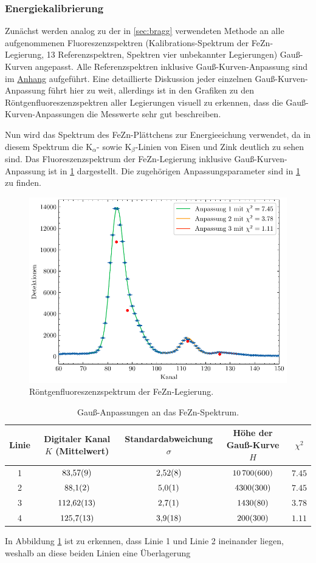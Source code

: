 \subsubsection*{Energiekalibrierung}\label{subsubsec:energie_kali}
Zunächst werden analog zu der in \cref{sec:bragg} verwendeten Methode an alle aufgenommenen Fluoreszenzspektren (Kalibrations-Spektrum der FeZn-Legierung, 13 Referenzspektren, Spektren vier unbekannter Legierungen)
Gauß-Kurven angepasst. Alle Referenzspektren inklusive Gauß-Kurven-Anpassung sind im \hyperref[sec:anhang]{Anhang} aufgeführt. Eine detaillierte Diskussion
jeder einzelnen Gauß-Kurven-Anpassung führt hier zu weit, allerdings ist in den Grafiken zu den Röntgenfluoreszenzspektren aller Legierungen visuell zu erkennen, dass die Gauß-Kurven-Anpassungen
die Messwerte sehr gut beschreiben.\par
Nun wird das Spektrum des FeZn-Plättchens zur Energieeichung verwendet, da in diesem Spektrum die $\mathrm{K}_{\alpha}$- sowie $\mathrm{K}_{\beta}$-Linien
von Eisen und Zink deutlich zu sehen sind. Das Fluoreszenzspektrum der FeZn-Legierung inklusive Gauß-Kurven-Anpassung ist in \cref{fig:fezn} dargestellt.
Die zugehörigen Anpassungsparameter sind in \cref{tab:fezn-gauss-fits} zu finden.
\begin{figure}[H]
	\centering
	\includegraphics[width=0.6\linewidth]{../figs/FeZn.pdf}
	\caption{Röntgenfluoreszenzspektrum der FeZn-Legierung.}
	\label{fig:fezn}
\end{figure}
\begin{table}[H]
    \centering
 \caption{Gauß-Anpassungen an das FeZn-Spektrum.}
 \begin{tabular}{c c c c c}
 \hline Linie & Digitaler Kanal $K$ (Mittelwert) & Standardabweichung $\sigma$ & Höhe der Gauß-Kurve $H$ & $\chi^2$ \\ 
 \hline
 1 & $\num{83.57\pm 0.09}$ & $\num{2.52\pm 0.08}$ & $\num{10700\pm 600}$ & $\num{7.45}$ \\
 2 & $\num{88.1\pm 0.2}$ & $\num{5.0\pm 0.1}$ & $\num{4300\pm 300}$ & $\num{7.45}$ \\
 3 & $\num{112.62\pm 0.13}$ & $\num{2.7\pm 0.1}$ & $\num{1430\pm 80}$ & $\num{3.78}$ \\
 4 & $\num{125.7\pm 1.3}$ & $\num{3.9\pm 1.8}$ & $\num{200\pm 300}$ & $\num{1.11}$ \\
 \hline\end{tabular}
 \label{tab:fezn-gauss-fits}
\end{table} In Abbildung \cref{fig:fezn} ist zu erkennen, dass Linie 1 und Linie 2 ineinander liegen, weshalb an diese beiden Linien eine Überlagerung
